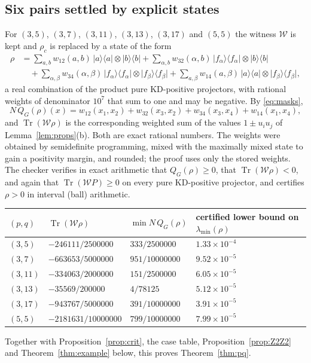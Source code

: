 \documentclass[11pt,a4paper]{article}
\theoremstyle{definition}
\theoremstyle{plain}
\DeclareMathOperator{\Tr}{Tr}
\newcommand{\Wc}{\mathcal W}
\newcommand{\ket}[1]{\lvert#1\rangle}
\newcommand{\bra}[1]{\langle#1\rvert}
\begin{document}
\subsection{Six pairs settled by explicit states}\label{sec:six}
For $(3,5)$, $(3,7)$, $(3,11)$, $(3,13)$, $(3,17)$ and $(5,5)$ the witness
$\Wc$ is kept and $\rho_c$ is replaced by a state of the form
\begin{align*}
 \rho&=\sum_{a,b}w_{12}(a,b)\,\ket a\bra a\otimes\ket b\bra b
 +\sum_{\alpha,b}w_{32}(\alpha,b)\,\ket{f_\alpha}\bra{f_\alpha}\otimes\ket b\bra b\\
 &\quad+\sum_{\alpha,\beta}w_{34}(\alpha,\beta)\,\ket{f_\alpha}\bra{f_\alpha}\otimes\ket{f_\beta}\bra{f_\beta}
 +\sum_{a,\beta}w_{14}(a,\beta)\,\ket a\bra a\otimes\ket{f_\beta}\bra{f_\beta},
\end{align*}
a real combination of the product pure KD-positive projectors, with rational
weights of denominator $10^7$ that sum to one and may be negative. By
\eqref{eq:masks},
\[
 N\,Q_G(\rho)(x)=w_{12}(x_1,x_2)+w_{32}(x_3,x_2)+w_{34}(x_3,x_4)+w_{14}(x_1,x_4),
\]
and $\Tr(\Wc\rho)$ is the corresponding weighted sum of the values
$1\pm u_iu_j$ of Lemma~\ref{lem:props}(b). Both are exact rational numbers.
The weights were obtained by semidefinite programming, mixed with the
maximally mixed state to gain a positivity margin, and rounded; the proof
uses only the stored weights. The checker verifies in exact arithmetic that
$Q_G(\rho)\geq0$, that $\Tr(\Wc\rho)<0$, and again that $\Tr(\Wc P)\geq0$ on
every pure KD-positive projector, and certifies $\rho>0$ in interval (ball)
arithmetic.
\begin{center}
\renewcommand{\arraystretch}{1.25}
\begin{tabular}{llll}
\hline
$(p,q)$ & $\Tr(\Wc\rho)$ & $\min N\,Q_G(\rho)$ & certified lower bound on $\lambda_{\min}(\rho)$\\
\hline
$(3,5)$ & $-246111/2500000$ & $333/2500000$ & $1.33\times10^{-4}$\\
$(3,7)$ & $-663653/5000000$ & $951/10000000$ & $9.52\times10^{-5}$\\
$(3,11)$ & $-334063/2000000$ & $151/2500000$ & $6.05\times10^{-5}$\\
$(3,13)$ & $-35569/200000$ & $4/78125$ & $5.12\times10^{-5}$\\
$(3,17)$ & $-943767/5000000$ & $391/10000000$ & $3.91\times10^{-5}$\\
$(5,5)$ & $-2181631/10000000$ & $799/10000000$ & $7.99\times10^{-5}$\\
\hline
\end{tabular}
\end{center}
Together with Proposition~\ref{prop:crit}, the case table,
Proposition~\ref{prop:Z2Z2} and Theorem~\ref{thm:example} below, this proves
Theorem~\ref{thm:pq}.
\end{document}
